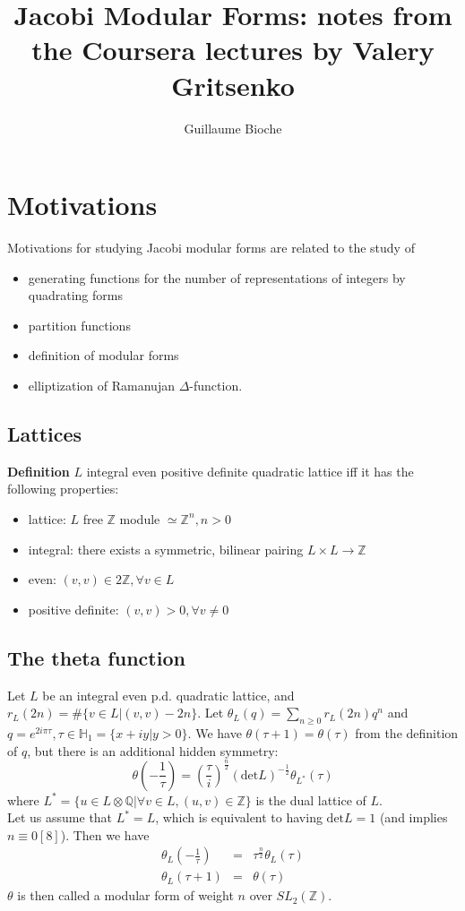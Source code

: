 \documentclass[10pt,a4paper]{article}
\begin{document}
\title{Jacobi Modular Forms: notes from the Coursera lectures by Valery Gritsenko}
\author{Guillaume Bioche}
\maketitle

\tableofcontents

\section{Motivations}
Motivations for studying Jacobi modular forms are related to the study of \begin{itemize}
\item generating functions for the number of representations of integers by quadrating forms
\item partition functions
\item definition of modular forms
\item elliptization of Ramanujan $\Delta$-function.
\end{itemize}

\subsection{Lattices}
\textbf{Definition} $L$ integral even positive definite quadratic lattice iff it has the following properties: 
\begin{itemize}
\item lattice: $L$ free $\mathbb{Z}$ module $\simeq\mathbb{Z}^n, n>0$
\item integral: there exists a symmetric, bilinear pairing $L\times L\rightarrow\mathbb{Z}$
\item even: $(v,v)\in2\mathbb{Z},\forall v\in L$
\item positive definite: $(v,v)>0,\forall v\neq 0$
\end{itemize}
\subsection{The theta function}
Let $L$ be an integral even p.d. quadratic lattice, and $r_L(2n)=\#\{v\in L |(v,v)-2n\}$. Let $\theta_L(q)=\sum_{n\geq0}r_L(2n)q^n$ and $q=e^{2i\pi\tau}, \tau\in\mathbb{H}_1=\{x+iy|y>0\}$. We have $\theta(\tau+1)=\theta(\tau)$ from the definition of $q$, but there is an additional hidden symmetry: 
\[\theta(-\frac{1}{\tau}) = (\frac{\tau}{i})^{\frac{n}{2}}(\textrm{det}L)^{-\frac{1}{2}}\theta_{L^*}(\tau)\]
where $L^*=\{u\in L\otimes \mathbb{Q}|\forall v\in L, (u,v)\in\mathbb{Z}\}$ is the dual lattice of $L$.
\\
Let us assume that $L^*=L$, which is equivalent to having $\textrm{det}L=1$ (and implies $n\equiv 0[8]$). Then we have
\begin{eqnarray*}
\theta_L(-\frac{1}{\tau})&=&\tau^{\frac{n}{2}}\theta_L(\tau)\\
\theta_L(\tau+1)&=&\theta(\tau)
\end{eqnarray*}
$\theta$ is then called a modular form of weight $n$ over $SL_2(\mathbb{Z})$.
\end{document}
